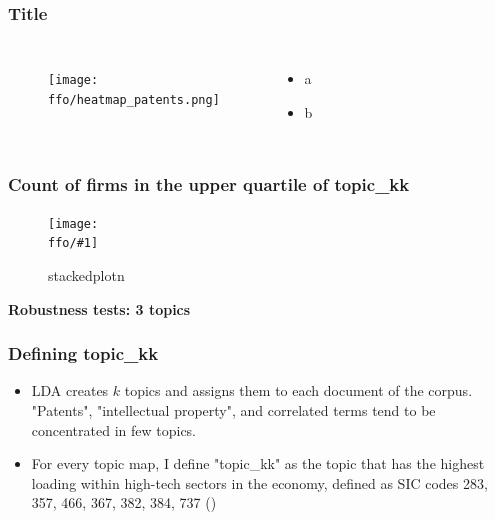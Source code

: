 \documentclass{beamer}
\newcommand{\ffo}{dicfullmc10thr10defnob5noa0_8_4t}
\newcommand{\ffoiii}{dicfullmc10thr10defnob5noa0_8_3t}
\newcommand{\insertfigure}[2]{
\begin{figure}[h!]
  \centering
  \texttt{[image: \\ffo/\#1]}
  \centering
  \captionsetup{font=scriptsize}
  \caption{#2}
  \label{fig:#1}
\end{figure}
}
\begin{document}
\begin{frame}
\frametitle{Title}
       \begin{columns}
             \begin{figure}[h!]
		  \centering
		  \texttt{[image: \\ffo/heatmap\_patents.png]}
		  \captionsetup{font=scriptsize}
		  \label{fig:heatmappatents}
			\end{figure}
          \scriptsize
              \begin{itemize}
			  \item a
			  \item b
			\end{itemize}
	  \end{columns} 
\end{frame}

\begin{frame}
\frametitle{Count of firms in the upper quartile of topic\_kk}
\insertfigure{stackedplot_n}{stackedplotn}
\end{frame}

\begin{frame}
\label{robthree}
\centering
\huge\bfseries Robustness tests: 3 topics
\hyperlink{results}{}
\end{frame}

\begin{frame}
  \frametitle{Defining topic\_kk}
  \begin{itemize}
  \item LDA creates $k$ topics and assigns them to each document of the corpus. "Patents", "intellectual property", and correlated terms tend to be concentrated in few topics.
  \item For every topic map, I define "topic\_kk" as the topic that has the highest loading within high-tech sectors in the economy, defined as SIC codes 283, 357, 466, 367, 382, 384, 737 (\cite{Brown2009-zp}) 
  
\end{itemize}

\end{frame}
\end{document}
